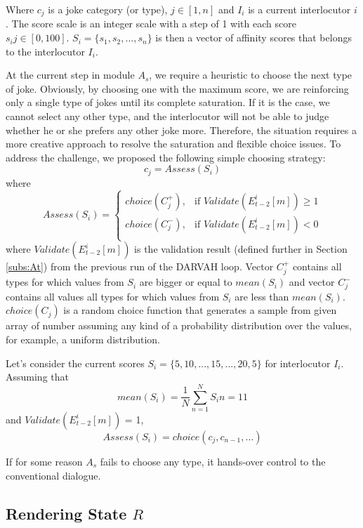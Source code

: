 Where \( c_j\) is a joke category (or type), \( j \in [1, n]\) and \( I_i\) is a current interlocutor \( i\). The score scale is an integer scale with a step of 1 with each score \( s_ij \in [0, 100]\). \( S_i=\{s_1, s_2,..., s_n\}\) is then a vector of affinity scores that belongs to the interlocutor \( I_i\). \par

At the current step in module \( A_s\), we require a heuristic to choose the next type of joke. Obviously, by choosing one with the maximum score, we are reinforcing only a single type of jokes until its complete saturation. If it is the case, we cannot select any other type, and the interlocutor will not be able to judge whether he or she prefers any other joke more. Therefore, the situation requires a more creative approach to resolve the saturation and flexible choice issues. To address the challenge, we proposed the following simple choosing strategy:
\[ c_j=Assess(S_i)\]
where 
$$
Assess(S_i)=
    \begin{cases}
        choice(C_j^+), & \text{if $Validate(E_{t-2}^{i}[m]) \geq 1$}\\
        choice(C_j^-), & \text{if $Validate(E_{t-2}^{i}[m]) < 0$}\\
    \end{cases}
$$
where \( Validate(E_{t-2}^{i}[m])\) is the validation result (defined further in Section \ref{subs:At}) from the previous run of the DARVAH loop. Vector \(C_j^+\) contains all types for which values from \(S_i\) are bigger or equal to \( mean(S_i)\) and vector \(C_j^-\) contains all values all types for which values from \(S_i\) are less than \( mean(S_i)\). \(choice(C_j)\) is a random choice function that generates a sample from given array of number assuming any kind of a probability distribution over the values, for example, a uniform distribution.

Let's consider the current scores \( S_i=\{5, 10,..., 15,..., 20, 5\}\) for interlocutor \( I_i\). Assuming that 
$$ mean(S_i) = \frac{1}{N} \sum_{n=1}^{N} S_in = 11$$
and \( Validate(E_{t-2}^{i}[m])\) = 1, 
\[ Assess(S_i)=choice(c_j, c_{n-1}, ...)\]

If for some reason \( A_s\) fails to choose any type, it hands-over control to the conventional dialogue. \par

\subsection{Rendering State \texorpdfstring{\( R\)}{R}}\label{subs:R}

